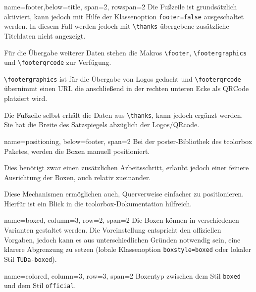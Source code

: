 \documentclass[
	accentcolor=9c,
	]{tudasciposter}
\newcommand{\tbs}{\textbackslash}
\let\code\texttt
\newcommand*{\macro}[1]{\code{\tbs#1}}
\let\pck\textsf
\begin{document}
\begin{tcbposter}[
	poster={
		columns=4,
		rows=7,
		spacing=1cm,
	},]
\begin{posterboxenv}[title=Fußzeile]{name=footer,below=title, span=2, rowspan=2 }
	Die Fußzeile ist grundsätzlich aktiviert, kann jedoch mit Hilfe der Klassenoption \code{footer=false} ausgeschaltet werden. In diesem Fall werden jedoch mit \macro{thanks} übergebene zusätzliche Titeldaten nicht angezeigt.

	Für die Übergabe weiterer Daten stehen die Makros \macro{footer}, \macro{footergraphics} und \macro{footerqrcode} zur Verfügung.

	\macro{footergraphics} ist für die Übergabe von Logos gedacht und \macro{footerqrcode} übernimmt einen URL die anschließend in der rechten unteren Ecke als QRCode platziert wird.

	Die Fußzeile selbst erhält die Daten aus \macro{thanks}, kann jedoch ergänzt werden. Sie hat die Breite des Satzspiegels abzüglich der Logos/QRcode.
\end{posterboxenv}

\begin{posterboxenv}[title=Platzierung der Boxen]{name=positioning, below=footer, span=2}
	Bei der \pck{poster}-Bibliothek des \pck{tcolorbox} Paketes, werden die Boxen manuell positioniert.

	Dies benötigt zwar einen zusätzlichen Arbeitsschritt, erlaubt jedoch einer feinere Ausrichtung der Boxen, auch relativ zueinander.

	Diese Mechanismen ermöglichen auch, Querverweise einfacher zu positionieren. Hierfür ist ein Blick in die \pck{tcolorbox}-Dokumentation hilfreich.
\end{posterboxenv}

\begin{posterboxenv}[title=Eine Box im Stil TUDa-boxed, TUDa-boxed]{name=boxed, column=3, row=2, span=2}
	Die Boxen können in verschiedenen Varianten gestaltet werden. Die Voreinstellung entspricht den offiziellen Vorgaben, jedoch kann es aus unterschiedlichen Gründen notwendig sein, eine klarere Abgrenzung zu setzen (lobale Klassenoption \code{boxstyle=boxed} oder lokaler Stil \code{TUDa-boxed}).
\end{posterboxenv}

\begin{posterboxenv}[title=Eine Box im Stil TUDa-colored, TUDa-colored]{name=colored, column=3, row=3, span=2}
	Boxentyp zwischen dem Stil \code{boxed} und dem Stil \code{official}.


\end{posterboxenv}
\end{tcbposter}
\end{document}
